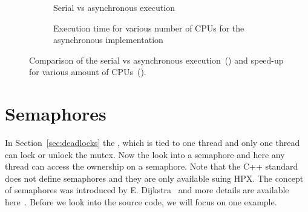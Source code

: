 \documentclass[11pt,fleqn]{book} %
\begin{document}
\begin{figure}[btp]
\centering
\begin{subfigure}{.4\textwidth}
\caption{Serial vs asynchronous execution}
\label{fig::stencil:benchmark:1}
\end{subfigure}

\begin{subfigure}{.4\textwidth}
\caption{Execution time for various number of CPUs for the asynchronous implementation}
\label{fig::stencil:benchmark:2}
\end{subfigure}
\caption{Comparison of the serial vs asynchronous execution~() and speed-up for various amount of CPUs~().}
\label{fig:hpx:stencil:scaling1}
\end{figure}

\section{Semaphores}
In Section~\ref{sec:deadlocks} the , which is tied to one thread and only one thread can lock or unlock the mutex. Now the look into a semaphore and here any thread can access the ownership on a semaphore. Note that the C++ standard does not define semaphores and they are only available suing HPX. The concept of semaphores was introduced by E. Dijkstra~\cite{dijkstra1962over} and more details are available here~\cite{downey2008little}. Before we look into the source code, we will focus on one example. \\
\end{document}
